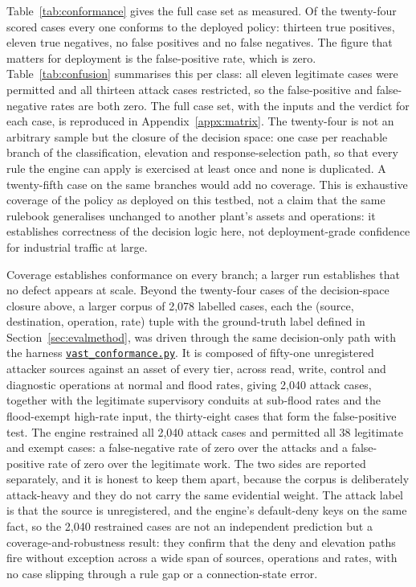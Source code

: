 Table~\ref{tab:conformance} gives the full case set as measured. Of the twenty-four scored cases every one conforms to the deployed policy: thirteen true positives, eleven true negatives, no false positives and no false negatives. The figure that matters for deployment is the false-positive rate, which is zero. Table~\ref{tab:confusion} summarises this per class: all eleven legitimate cases were permitted and all thirteen attack cases restricted, so the false-positive and false-negative rates are both zero. The full case set, with the inputs and the verdict for each case, is reproduced in Appendix~\ref{appx:matrix}. The twenty-four is not an arbitrary sample but the closure of the decision space: one case per reachable branch of the classification, elevation and response-selection path, so that every rule the engine can apply is exercised at least once and none is duplicated. A twenty-fifth case on the same branches would add no coverage. This is exhaustive coverage of the policy as deployed on this testbed, not a claim that the same rulebook generalises unchanged to another plant's assets and operations: it establishes correctness of the decision logic here, not deployment-grade confidence for industrial traffic at large.

Coverage establishes conformance on every branch; a larger run establishes that no defect appears at scale. Beyond the twenty-four cases of the decision-space closure above, a larger corpus of 2{,}078 labelled cases, each the (source, destination, operation, rate) tuple with the ground-truth label defined in Section~\ref{sec:evalmethod}, was driven through the same decision-only path with the harness \href{\repourl/blob/main/07_Evaluation/overnight/vast_conformance.py}{\texttt{vast\_conformance.py}}. It is composed of fifty-one unregistered attacker sources against an asset of every tier, across read, write, control and diagnostic operations at normal and flood rates, giving 2{,}040 attack cases, together with the legitimate supervisory conduits at sub-flood rates and the flood-exempt high-rate input, the thirty-eight cases that form the false-positive test. The engine restrained all 2{,}040 attack cases and permitted all 38 legitimate and exempt cases: a false-negative rate of zero over the attacks and a false-positive rate of zero over the legitimate work. The two sides are reported separately, and it is honest to keep them apart, because the corpus is deliberately attack-heavy and they do not carry the same evidential weight. The attack label is that the source is unregistered, and the engine's default-deny keys on the same fact, so the 2{,}040 restrained cases are not an independent prediction but a coverage-and-robustness result: they confirm that the deny and elevation paths fire without exception across a wide span of sources, operations and rates, with no case slipping through a rule gap or a connection-state error.

